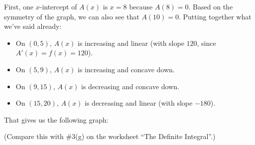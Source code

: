 \documentclass[main]{subfiles}
\begin{document}
\begin{enumerate}[resume]
\begin{enumerate}
    \begin{solution}
      First, one $x$-intercept of $A(x)$ is $x = 8$ because
      $A(8) = 0$.  Based on the symmetry of the graph, we can also
      see that $A(10)=0$. Putting together what we've said already:
      \begin{itemize}
      \item On $(0, 5)$, $A(x)$ is increasing and linear (with
        slope $120$, since $A'(x) = f(x) = 120$).
      \item On $(5, 9)$, $A(x)$ is increasing and concave down.
      \item On $(9, 15)$, $A(x)$ is decreasing and concave down.
      \item On $(15, 20)$, $A(x)$ is decreasing and linear (with
        slope $-180$).  
      \end{itemize}
      That gives us the following graph:
      \begin{center}
      \end{center}
      (Compare this with {{{{{{\#3}}(g)}} on {the worksheet ``The Definite Integral''}}}.)
    \end{solution}

  \end{enumerate}

\end{enumerate}
\end{document}
